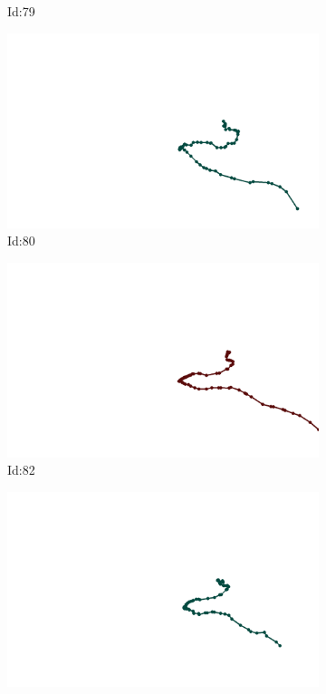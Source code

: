 \documentclass[12pt,twoside]{report}
\begin{document}
\begin{figure}
\begin{subfigure}[b]{0.20\textwidth}
\caption{Id:79}
\end{subfigure}
\begin{subfigure}[b]{0.20\textwidth}
\centering
\includegraphics[width=\textwidth]{../trajectories/80.png}
\caption{Id:80}
\end{subfigure}
\begin{subfigure}[b]{0.20\textwidth}
\centering
\includegraphics[width=\textwidth]{../trajectories/82.png}
\caption{Id:82}
\end{subfigure}
\begin{subfigure}[b]{0.20\textwidth}
\centering
\includegraphics[width=\textwidth]{../trajectories/206.png}

\end{subfigure}
\end{figure}
\end{document}
